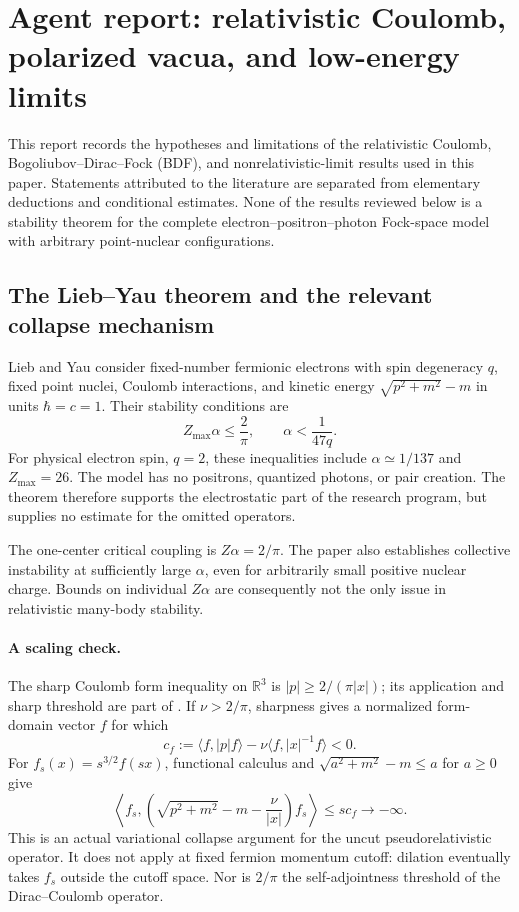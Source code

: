 \section{Agent report: relativistic Coulomb, polarized vacua, and low-energy limits}
\label{app-rel:report}

This report records the hypotheses and limitations of the relativistic Coulomb,
Bogoliubov--Dirac--Fock (BDF), and nonrelativistic-limit results used in this
paper. Statements attributed to the literature are separated from elementary
deductions and conditional estimates. None of the results reviewed below is a
stability theorem for the complete electron--positron--photon Fock-space model
with arbitrary point-nuclear configurations.

\subsection{The Lieb--Yau theorem and the relevant collapse mechanism}
\label{app-rel:lieb-yau}

Lieb and Yau \cite{LY1988} consider fixed-number fermionic electrons with
spin degeneracy $q$, fixed point nuclei, Coulomb interactions, and kinetic
energy $\sqrt{p^2+m^2}-m$ in units $\hbar=c=1$. Their stability conditions are
\begin{equation}
 Z_{\max}\alpha\le \frac{2}{\pi},\qquad
 \alpha<\frac{1}{47q}.
 \label{app-rel:ly-conditions}
\end{equation}
For physical electron spin, $q=2$, these inequalities include
$\alpha\simeq1/137$ and $Z_{\max}=26$. The model has no positrons, quantized
photons, or pair creation. The theorem therefore supports the electrostatic
part of the research program, but supplies no estimate for the omitted
operators.

The one-center critical coupling is $Z\alpha=2/\pi$. The paper also
establishes collective instability at sufficiently large $\alpha$, even for
arbitrarily small positive nuclear charge. Bounds on individual $Z\alpha$
are consequently not the only issue in relativistic many-body stability.

\paragraph{A scaling check.}
The sharp Coulomb form inequality on $\mathbb R^3$ is
$|p|\ge 2/(\pi|x|)$; its application and sharp threshold are part of
\cite{LY1988}. If $\nu>2/\pi$, sharpness gives a normalized form-domain
vector $f$ for which
\[
 c_f:=\langle f,|p|f\rangle-
 \nu\langle f,|x|^{-1}f\rangle<0.
\]
For $f_s(x)=s^{3/2}f(sx)$, functional calculus and
$\sqrt{a^2+m^2}-m\le a$ for $a\ge0$ give
\begin{equation}
 \left\langle f_s,
 \left(\sqrt{p^2+m^2}-m-\frac{\nu}{|x|}\right)f_s
 \right\rangle\le s c_f\longrightarrow-\infty.
 \label{app-rel:collapse-scaling}
\end{equation}
This is an actual variational collapse argument for the uncut
pseudorelativistic operator. It does not apply at fixed fermion momentum
cutoff: dilation eventually takes $f_s$ outside the cutoff space. Nor is
$2/\pi$ the self-adjointness threshold of the Dirac--Coulomb operator.

